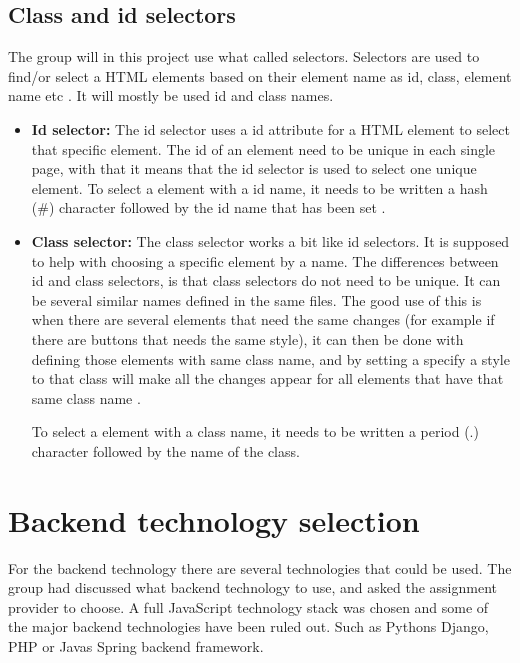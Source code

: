 \subsection{Class and id selectors}
The group will in this project use what called selectors. Selectors are used to find/or select a HTML elements based on their element name as id, class, element name etc \cite{selectors}. 
It will mostly be used id and class names.
\begin{itemize}
  \item \textbf{Id selector:}
The id selector uses a id attribute for a HTML element to select that specific element.
The id of an element need to be unique in 
each single page, with that it means that the id selector is used to select one unique element. To select a element with a id name, it needs to be written a hash (\#) character followed by the id name that has been set \cite{selectors}. 
  \item \textbf{Class selector:}
The class selector works a bit like id selectors. It is supposed to help with choosing a specific element by a name. The differences between id and class selectors, is that class selectors do not need to be unique. It can be several similar names defined in the same files. The good use of this is when there are several elements that need the same changes (for example if there are buttons that needs the same style), it can then be done with defining those elements with same class name, and by setting a specify a style to that class will make all the changes appear for all elements that have that same class name \cite{selectors}.

To select a element with a class name, it needs to be written a period (.) character followed by the name of the class.
\end{itemize}




\section{Backend technology selection}
For the backend technology there are several technologies that could be used. The group had discussed what backend technology to use, and asked the assignment provider to choose. A full JavaScript technology stack was chosen and some of the major backend technologies have been ruled out. Such as Pythons Django, PHP or Javas Spring backend framework. 

